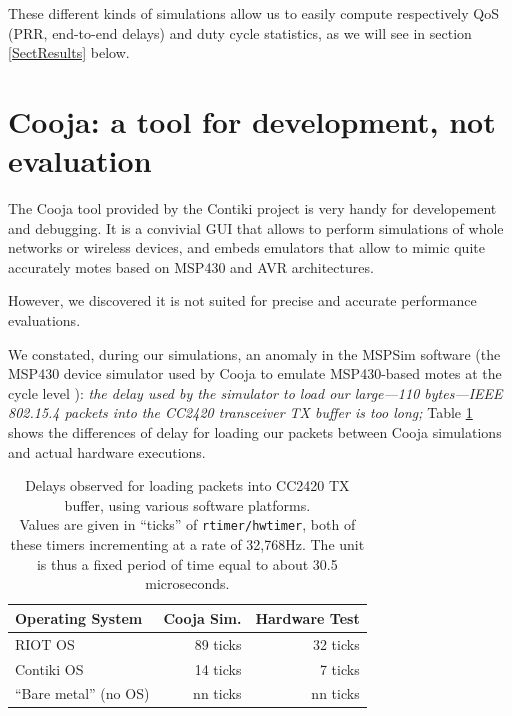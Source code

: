 \documentclass[conference]{IEEEtran}
\begin{document}
These different kinds of simulations allow us to easily compute respectively
QoS (PRR, end-to-end delays) and duty cycle statistics, as we will see
in section \ref{SectResults} below.



\section{Cooja: a tool for development, not evaluation}
\label{SectCoojaDevNotEval}

The Cooja tool provided by the Contiki project \cite{Cooja} is very handy for
developement and debugging. It is a convivial GUI that allows to perform
simulations of whole networks or wireless devices, and embeds emulators
that allow to mimic quite accurately motes based on MSP430 and AVR
architectures.

However, we discovered it is not suited for precise and accurate
performance evaluations.

We constated, during our simulations, an anomaly in the MSPSim software
(the MSP430 device simulator used by Cooja to emulate MSP430-based motes
at the cycle level \cite{MSPSim}): \emph{the delay used by the simulator
to load our large---110 bytes---IEEE 802.15.4 packets into the CC2420
transceiver TX buffer is too long;} Table \ref{TblTXPktLoadDelays} shows
the differences of delay for loading our packets between Cooja simulations
and actual hardware executions.

\begin{table}[!h]
\centering
\begin{tabular}{|l|r|r|}
\hline
Operating System       &  Cooja Sim.  & Hardware Test \\
\hline
RIOT OS                &   89 ticks   &  32 ticks \\ 
Contiki OS             &   14 ticks   &   7 ticks \\
``Bare metal'' (no OS) &   nn ticks   &  nn ticks \\
\hline
\end{tabular}
\caption{Delays observed for loading packets into CC2420 TX buffer,
using various software platforms.\\
Values are given in ``ticks'' of \texttt{rtimer/hwtimer}, both of these
timers incrementing at a rate of 32,768Hz. The unit is thus a fixed period
of time equal to about 30.5 microseconds.}
\label{TblTXPktLoadDelays}
\end{table}
\end{document}
